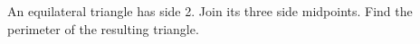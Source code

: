 An equilateral triangle has side 2. Join its three side midpoints. Find the perimeter of the resulting triangle.
